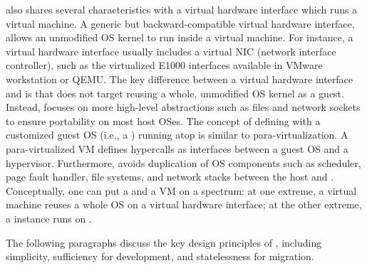 \Thehostabi{} also shares several characteristics with a virtual hardware interface which runs a virtual machine.
A generic but backward-compatible
virtual hardware interface,
allows an unmodified OS kernel to run inside a virtual machine.
For instance, a virtual hardware interface
usually includes a virtual NIC (network interface controller),
such as the virtualized E1000 interfaces
available in VMware workstation or QEMU.
The key difference between
a virtual hardware interface
and \thehostabi{}
is that \thehostabi{} does not target reusing a whole, unmodified OS kernel as a guest.
Instead, 
\thehostabi{} focuses on more high-level abstractions such as files and network sockets
to ensure portability on most host OSes.
The concept
of defining \thehostabi{}
with a customized guest OS (i.e., a \libos{}) running atop \thehostabi{} is similar to para-virtualization.
A para-virtualized VM defines hypercalls as interfaces between a guest OS and a hypervisor.
Furthermore, \thehostabi{} avoids duplication of OS components
such as scheduler, page fault handler, file systems, and network stacks
between the host and \libos{}.
Conceptually, one can put a \libos{} and a VM on a spectrum:
at one extreme,
a virtual machine reuses a whole OS
on a virtual hardware interface; at the other extreme,
a \graphene{} \libos{} instance runs on
\thehostabi{}.

The following paragraphs discuss the key design principles of \thehostabi{},
including simplicity, sufficiency for \libos{} development, and statelessness for migration.

